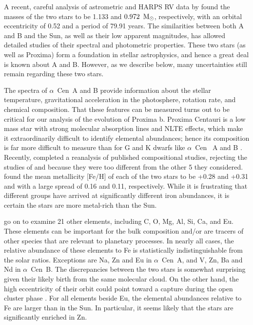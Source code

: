 \documentclass[preprint,12pt]{aastex}
\def\msun{{\rm\,M_\odot}}
\def\eg{{\it e.g.\ }}
\def\acen{{$\alpha$~Cen}}
\begin{document}
A recent, careful analysis of astrometric and HARPS RV data by
\cite{PourbaixBoffin16} found the masses of the two stars to be 1.133
and $0.972~\msun$, respectively, with an orbital eccentricity of 0.52
and a period of 79.91 years. The similarities between both A and B and
the Sun, as well as their low apparent magnitudes, has allowed
detailed studies of their spectral and photometric properties. These
two stars (as well as Proxima) form a foundation in stellar astrophysics,
and hence a great deal is known about A and B. However, as we describe
below, many uncertainties still remain regarding these two stars.

The spectra of \acen~A and B provide information about the stellar
temperature, gravitational acceleration in the photosphere, rotation
rate, and chemical composition. That these features can be
measured turns out to be critical for our analysis of the evolution of
Proxima b. Proxima Centauri is a low mass star with strong molecular
absorption lines and NLTE effects, which make it extraordinarily
difficult to identify elemental abundances; hence its composition
is far more difficult to measure than for G and K dwarfs like \acen~ A
and B \citep{Johnson2009}.  Recently, \cite{HinkelKane13} completed a
reanalysis of published compositional studies, rejecting the studies
of \cite{Laird85} and \cite{NeuforgeMagain97} because they were too
different from the other 5 they considered.  \cite{HinkelKane13}
  found the mean metallicity [Fe/H] of each of the two stars to be
+0.28 and +0.31 and with a large spread of 0.16 and 0.11,
respectively. While it is frustrating that different groups have
arrived at significantly different iron abundances, it is certain the
stars are more metal-rich than the Sun.

\cite{HinkelKane13} go on to examine 21 other elements, including C,
O, Mg, Al, Si, Ca, and Eu. These elements can be important for the
bulk composition and/or are tracers of other species that are relevant
to planetary processes. In nearly all cases, the relative abundance of
these elements to Fe is statistically indistinguishable from the solar
ratios. Exceptions are Na, Zn and Eu in \acen~A, and V, Zn, Ba
and Nd in \acen~B. The discrepancies between the two stars is
somewhat surprising given their likely birth from the same molecular
cloud. On the other hand, the high eccentricity of their orbit could
point toward a capture during the open cluster phase \citep[\eg][]{Malmberg07}. For all
elements beside Eu, the elemental abundances relative to Fe are larger
than in the Sun. In particular, it seems likely that the stars are
significantly enriched in Zn.
\end{document}
